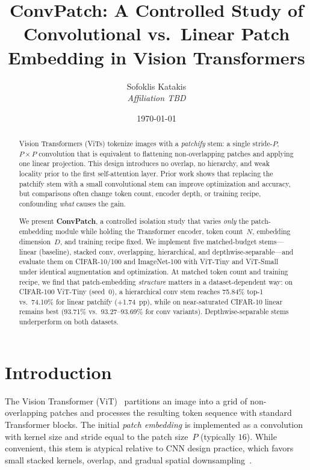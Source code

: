 \documentclass[10pt,twocolumn]{article}
\title{ConvPatch: A Controlled Study of Convolutional vs.\ Linear Patch Embedding in Vision Transformers}
\author{
  Sofoklis Katakis \\
  \textit{Affiliation TBD}
}
\date{\today}
\begin{document}
\maketitle

\begin{abstract}
Vision Transformers (ViTs) tokenize images with a \emph{patchify} stem: a single stride-$P$, $P{\times}P$ convolution that is equivalent to flattening non-overlapping patches and applying one linear projection.
This design introduces no overlap, no hierarchy, and weak locality prior to the first self-attention layer.
Prior work shows that replacing the patchify stem with a small convolutional stem can improve optimization and accuracy, but comparisons often change token count, encoder depth, or training recipe, confounding \emph{what} causes the gain.

We present \textbf{ConvPatch}, a controlled isolation study that varies \emph{only} the patch-embedding module while holding the Transformer encoder, token count~$N$, embedding dimension~$D$, and training recipe fixed.
We implement five matched-budget stems---linear (baseline), stacked conv, overlapping, hierarchical, and depthwise-separable---and evaluate them on CIFAR-10/100 and ImageNet-100 with ViT-Tiny and ViT-Small under identical augmentation and optimization.
At matched token count and training recipe, we find that patch-embedding \emph{structure} matters in a dataset-dependent way: on CIFAR-100 ViT-Tiny (seed~0), a hierarchical conv stem reaches 75.84\% top-1 vs.\ 74.10\% for linear patchify (+1.74~pp), while on near-saturated CIFAR-10 linear remains best (93.71\% vs.\ 93.27--93.69\% for conv variants). Depthwise-separable stems underperform on both datasets.
\end{abstract}

\section{Introduction}
\label{sec:intro}

The Vision Transformer (ViT)~\cite{dosovitskiy2021vit} partitions an image into a grid of non-overlapping patches and processes the resulting token sequence with standard Transformer blocks.
The initial \emph{patch embedding} is implemented as a convolution with kernel size and stride equal to the patch size~$P$ (typically $16$).
While convenient, this stem is atypical relative to CNN design practice, which favors small stacked kernels, overlap, and gradual spatial downsampling~\cite{xiao2021early}.
\end{document}
